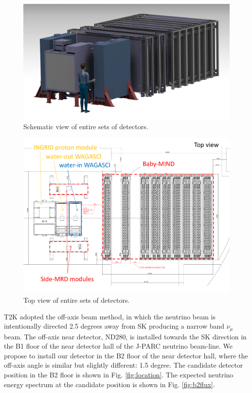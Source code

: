 \begin{figure}[tbh]
\begin{center}
\includegraphics[width=0.8\linewidth]{fig/wagasci_smrd_babymind.pdf}
\end{center}
\caption{
Schematic view of entire sets of detectors.
}
\label{fig:all_detector}
\end{figure}

\begin{figure}[tbh]
\begin{center}
\includegraphics[width=0.8\linewidth]{fig/wagasci_smrd_babymind_topview.pdf}
\end{center}
\caption{
Top view of entire sets of detectors.
}
\label{fig:all_detector_topview}
\end{figure}


T2K adopted the off-axis beam method, in which
the neutrino beam is intentionally directed 2.5 degrees away from SK producing a narrow band $\nu_{\mu}$ beam.
The off-axis near detector, ND280, is installed towards the SK direction in the B1 floor of the near detector hall of the J-PARC neutrino beam-line.
We propose to install our detector in the B2 floor of the near detector hall, 
where the off-axis angle is similar but slightly different: 1.5 degree.
The candidate detector position in the B2 floor is shown in Fig. \ref{fig:location}.
The expected neutrino energy spectrum at the candidate position is shown in Fig. \ref{fig:b2flux}.


